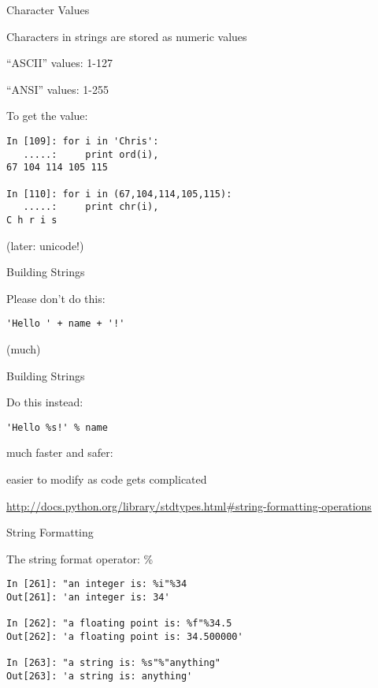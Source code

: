 \documentclass{beamer}
\begin{document}
\begin{frame}[fragile]{Character Values}

{\Large Characters in strings are stored as numeric values}

\vfill
{\large ``ASCII'' values: 1-127}

\vfill
{\large ``ANSI'' values: 1-255}


\vfill
{\large To get the value:}
\begin{verbatim}
In [109]: for i in 'Chris':
   .....:     print ord(i), 
67 104 114 105 115

In [110]: for i in (67,104,114,105,115):
   .....:     print chr(i),
C h r i s
\end{verbatim}

\vfill
(later: unicode!)
\end{frame} 


\begin{frame}[fragile]{Building Strings}

{\Large Please don't do this:

\vfill
\begin{verbatim}
'Hello ' + name + '!'
\end{verbatim}
}
\vfill
(much)

\end{frame} 

\begin{frame}[fragile]{Building Strings}

{\Large Do this instead:

\vfill
\begin{verbatim}
'Hello %s!' % name
\end{verbatim}

\vfill
much faster and safer:

\vfill
easier to modify as code gets complicated
}

\vfill
\url{http://docs.python.org/library/stdtypes.html#string-formatting-operations}
\end{frame} 


\begin{frame}[fragile]{String Formatting}

{\Large The string format operator: \%}

\begin{verbatim}
In [261]: "an integer is: %i"%34
Out[261]: 'an integer is: 34'

In [262]: "a floating point is: %f"%34.5
Out[262]: 'a floating point is: 34.500000'

In [263]: "a string is: %s"%"anything"
Out[263]: 'a string is: anything'
\end{verbatim}

\end{frame} 
\end{document}
